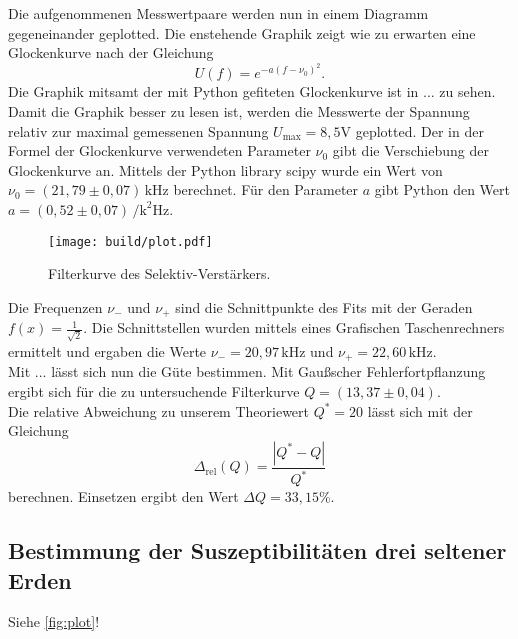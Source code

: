 Die aufgenommenen Messwertpaare werden nun in einem Diagramm gegeneinander geplotted. Die 
enstehende Graphik zeigt wie zu erwarten eine Glockenkurve nach der Gleichung
\begin{equation*}
  U(f) = e^{-a(f-\nu_0)^2}.
\end{equation*}
Die Graphik mitsamt der mit Python gefiteten Glockenkurve ist in ... zu sehen.\\
Damit die Graphik besser zu lesen ist, werden die Messwerte der Spannung relativ zur 
maximal gemessenen Spannung $U_{\mathrm{max}} = 8,5 \si{\volt}$ geplotted. Der in der Formel
der Glockenkurve verwendeten Parameter $\nu_0$ gibt die Verschiebung der Glockenkurve an.
Mittels der Python library scipy wurde ein Wert von $\nu_0 = (21,79 \pm 0,07) \, \si{\kilo\hertz} $
berechnet. Für den Parameter $a$ gibt Python den Wert 
$a = (0,52 \pm 0,07 ) \, \si{\per\square\kilo\hertz}$.\\
\begin{figure}
  \centering
  \texttt{[image: build/plot.pdf]}
  \caption{Filterkurve des Selektiv-Verstärkers.}
  \label{Abb:Absorption}
\end{figure}
Die Frequenzen $\nu_{-}$ und $\nu_{+}$ sind die Schnittpunkte des Fits mit der Geraden
$f(x) = \frac{1}{\sqrt{2}}$. Die Schnittstellen wurden mittels eines Grafischen Taschenrechners
ermittelt und ergaben die Werte $\nu_{-} = 20,97 \, \si{\kilo\hertz}$ und $\nu_{+} = 22,60 \, \si{\kilo\hertz}$.\\
Mit ... lässt sich nun die Güte bestimmen. Mit Gaußscher Fehlerfortpflanzung ergibt sich
für die zu untersuchende Filterkurve $Q = (13,37 \pm 0,04)$.\\
Die relative Abweichung zu unserem Theoriewert $Q^* = 20$ lässt sich mit der Gleichung
\begin{equation*}
    \Delta_{\mathrm{rel}}(Q) = \frac{|Q^* - Q|}{Q^*}
\end{equation*}
berechnen. Einsetzen ergibt den Wert $\Delta Q = 33,15 \%$.\\

\subsection{Bestimmung der Suszeptibilitäten drei seltener Erden}

Siehe \autoref{fig:plot}!
